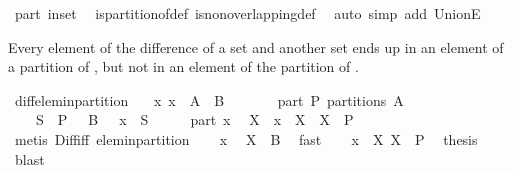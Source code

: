 \begin{isabellebody}
\ part\ in{\isacharunderscore}set\ \isamarkupfalse%
\ is{\isacharunderscore}partition{\isacharunderscore}of{\isacharunderscore}def\ is{\isacharunderscore}non{\isacharunderscore}overlapping{\isacharunderscore}def\ \isamarkupfalse%
\ {\isacharparenleft}auto\ simp\ add{\isacharcolon}\ UnionE{\isacharparenright}%
\endisatagproof
{\isafoldproof}%
%
\isadelimproof
%
\endisadelimproof
%
\begin{isamarkuptext}%
Every element of the difference of a set  and another set  ends up in 
  an element of a partition of , but not in an element of the partition of .%
\end{isamarkuptext}%
\isamarkuptrue%
\isamarkupfalse%
\ diff{\isacharunderscore}elem{\isacharunderscore}in{\isacharunderscore}partition{\isacharcolon}\isanewline
\ \ \ x{\isacharcolon}\ {\isachardoublequoteopen}x\ {\isasymin}\ A\ {\isacharminus}\ B{\isachardoublequoteclose}\isanewline
\ \ \ \ \ \ \ part{\isacharcolon}\ {\isachardoublequoteopen}P\ partitions\ A{\isachardoublequoteclose}\isanewline
\ \ \ {\isachardoublequoteopen}{\isasymexists}\ S\ {\isasymin}\ P\ {\isacharminus}\ {\isacharbraceleft}\ B\ {\isacharbraceright}\ {\isachardot}\ x\ {\isasymin}\ S{\isachardoublequoteclose}\isanewline
%
\isadelimproof
\isanewline
%
\endisadelimproof
%
\isatagproof
{}\isamarkupfalse%
\ {\isacharminus}\isanewline
\ \ \isamarkupfalse%
\ part\ x\ \isamarkupfalse%
\ X\ \ {\isachardoublequoteopen}x\ {\isasymin}\ X{\isachardoublequoteclose}\ \ {\isachardoublequoteopen}X\ {\isasymin}\ P{\isachardoublequoteclose}\isanewline
\ \ \ \ \isamarkupfalse%
\ {\isacharparenleft}metis\ Diff{\isacharunderscore}iff\ elem{\isacharunderscore}in{\isacharunderscore}partition{\isacharparenright}\isanewline
\ \ \isamarkupfalse%
\ x\ \isamarkupfalse%
\ {\isachardoublequoteopen}X\ {\isasymnoteq}\ B{\isachardoublequoteclose}\ \isamarkupfalse%
\ fast\isanewline
\ \ \isamarkupfalse%
\ {\isacharbackquoteopen}x\ {\isasymin}\ X{\isacharbackquoteclose}\ {\isacharbackquoteopen}X\ {\isasymin}\ P{\isacharbackquoteclose}\ \isamarkupfalse%
\ {\isacharquery}thesis\ \isamarkupfalse%
\ blast\isanewline
{}\isamarkupfalse%
%
\endisatagproof
{\isafoldproof}%
%
\isadelimproof
%
\endisadelimproof
%
\begin{isamarkuptext}%

\end{isamarkuptext}
\end{isabellebody}

